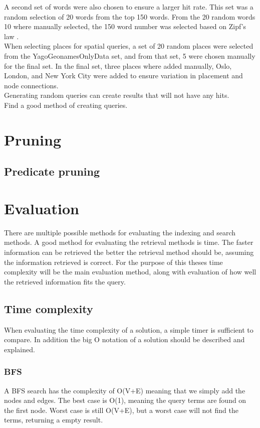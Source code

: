 A second set of words were also chosen to ensure a larger hit rate. This set was a random selection of 20 words from the top 150 words. From the 20 random words 10 where manually selected, the 150 word number was selected based on Zipf's law \cite{zipf}.\\

When selecting places for spatial queries, a set of 20 random places were selected from the YagoGeonamesOnlyData set, and from that set, 5 were chosen manually for the final set. In the final set, three places where added manually, Oslo, London, and New York City were added to ensure variation in placement and node connections.\\

Generating random queries can create results that will not have any hits.\\
Find a good method of creating queries.\\

\section{Pruning}
\subsection{Predicate pruning}

\section{Evaluation}
There are multiple possible methods for evaluating the indexing and search methods. A good method for evaluating the retrieval methods is time. The faster information can be retrieved the better the retrieval method should be, assuming the information retrieved is correct. For the purpose of this theses time complexity will be the main evaluation method, along with evaluation of how well the retrieved information fits the query.\\

\subsection{Time complexity}
When evaluating the time complexity of a solution, a simple timer is sufficient to compare. In addition the big O notation of a solution should be described and explained.

\subsubsection{BFS}
A BFS search has the complexity of O(V+E) meaning that we simply add the nodes and edges. The best case is O(1), meaning the query terms are found on the first node. Worst case is still O(V+E), but a worst case will not find the terms, returning a empty result.\\

